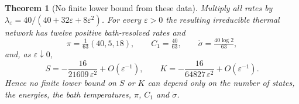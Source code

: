 \documentclass[11pt,a4paper]{article}
\newtheorem{theorem}{Theorem}[section]
\theoremstyle{remark}\newtheorem{remark}[theorem]{Remark}
\newcommand{\eps}{\varepsilon}
\begin{document}
\begin{theorem}[No finite lower bound from these data]\label{thm:full}
Multiply all rates by $\lambda_\eps=40/(40+32\eps+8\eps^2)$. For every $\eps>0$ the resulting irreducible thermal network has twelve positive bath-resolved rates and
\begin{equation}\label{eq:fixeddata}
\pi=\tfrac1{63}(40,5,18),\qquad C_1=\tfrac{40}{63},\qquad\dot\sigma=\tfrac{40\log2}{63},
\end{equation}
and, as $\eps\downarrow0$,
\begin{equation}\label{eq:mainlimits}
S=-\frac{16}{21609\,\eps^2}+O(\eps^{-1}),\qquad K=-\frac{16}{64827\,\eps^2}+O(\eps^{-1}).
\end{equation}
Hence no finite lower bound on $S$ or $K$ can depend only on the number of states, the energies, the bath temperatures, $\pi$, $C_1$ and $\dot\sigma$.
\end{theorem}
\end{document}
